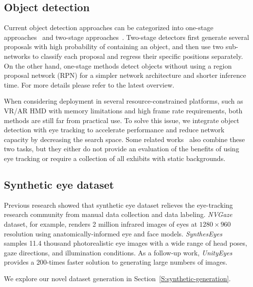 \subsection{Object detection}

Current object detection approaches can be categorized into one-stage
approaches~\cite{redmon2016you, liu2016ssd, lin2017focal} and two-stage
approaches~\cite{girshick2014rich, girshick2015fast, ren2015faster, he2017mask}.
Two-stage detectors first generate several proposals with high probability of
containing an object, and then use two sub-networks to classify each
proposal and regress their specific positions separately. On the other hand,
one-stage methods detect objects without using a region proposal network (RPN)
for a simpler network architecture and shorter inference time. For more details
please refer to the latest overview\cite{liu2020deep}.

When considering deployment in several resource-constrained platforms, such as
VR/AR HMD with memory limitations and high frame rate requirements, both methods
are still far from practical use. To solve this issue, we integrate object
detection with eye tracking to accelerate performance and reduce network
capacity by decreasing the search space. Some related works~\cite{toyama2012gaze,
ishiguro2010aided, bonino2009blueprint} also combine these two tasks, but they
either do not provide an evaluation of the benefits of using eye tracking or
require a collection of all exhibits with static backgrounds.

\subsection{Synthetic eye dataset}\label{S:synthetic-dataset}

Previous research showed that synthetic eye dataset relieves the eye-tracking
research community from manual data collection and data labeling.
\emph{NVGaze}~\cite{kim2019nvgaze} dataset, for example, renders 2 million
infrared images of eyes at \(1280 \times 960\) resolution using
anatomically-informed eye and face models.
\emph{SynthesEyes}~\cite{wood2015rendering} samples 11.4 thousand photorealistic
eye images with a wide range of head poses, gaze directions, and illumination
conditions. As a follow-up work, \emph{UnityEyes}~\cite{wood2016learning}
provides a 200-times faster solution to generating large numbers of images.


We explore our novel dataset generation in Section~\ref{S:synthetic-generation}.

